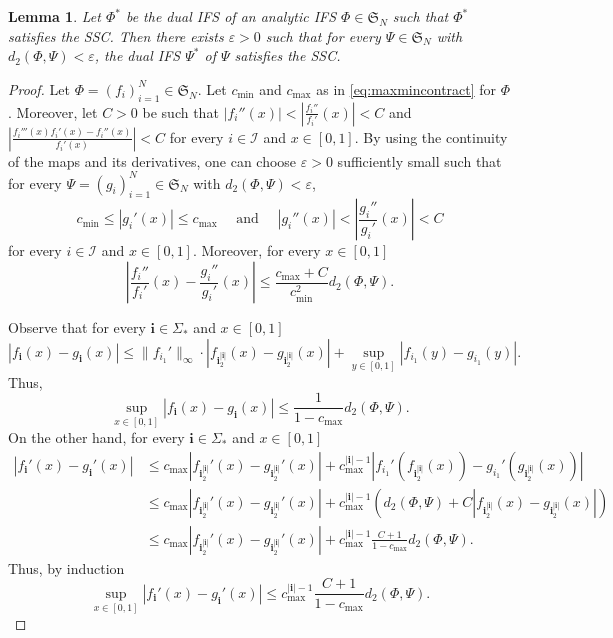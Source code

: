 \documentclass[11pt,]{article}
\def\cref#1{\ref{#1}}%
\newtheorem{lemma}[theorem]{Lemma}
\theoremstyle{definition}
\theoremstyle{remark}
\newcommand{\0}{\mathbf{0}}
\newcommand{\bi}{\mathbf{i}}
\numberwithin{equation}{section}
\begin{document}
\begin{lemma}\label{lem:cont}
  Let $\Phi^*$ be the dual IFS of an analytic IFS $\Phi\in\mathfrak{S}_N$ such that $\Phi^*$
  satisfies the SSC. Then there exists $\varepsilon>0$ such that for every $\Psi\in\mathfrak{S}_N$
  with $d_2(\Phi,\Psi)<\varepsilon$, the dual IFS $\Psi^*$ of $\Psi$ satisfies the SSC.
\end{lemma}

\begin{proof}
  Let $\Phi=(f_i)_{i=1}^N\in\mathfrak{S}_N$. Let $c_{\min}$ and $c_{\max}$ as in
  \cref{eq:maxmincontract} for $\Phi$. Moreover, let $C>0$ be such that
  $|f_i''(x)|<\left|\frac{f_i''}{f_i'}(x)\right|<C$ and
  $\left|\frac{f_i'''(x)f_i'(x)-f_i''(x)}{f_i'(x)}\right|<C$ for every $i\in\mathcal{I}$ and
  $x\in[0,1]$. By using the continuity of the maps and its derivatives, one can choose
  $\varepsilon>0$ sufficiently small such that for every $\Psi=(g_i)_{i=1}^N\in\mathfrak{S}_N$ with
  $d_2(\Phi,\Psi)<\varepsilon$, 
  $$
  c_{\min}\leq|g_i'(x)|\leq c_{\max}\quad\text{ and }\quad |g_i''(x)|<\left|\frac{g_i''}{g_i'}(x)\right|<C
  $$
  for every $i\in\mathcal{I}$ and $x\in[0,1]$. Moreover, for every $x\in[0,1]$
  \begin{equation}\label{eq:tec1}
    \left|\frac{f_i''}{f_i'}(x)-\frac{g_i''}{g_i'}(x)\right|\leq
    \frac{c_{\max}+C}{c_{\min}^{2}}d_2(\Phi,\Psi).
  \end{equation}

  Observe that for every $\bi\in\Sigma_*$ and $x\in[0,1]$
  $$
  |f_{\bi}(x)-g_{\bi}(x)|\leq\|f_{i_1}'\|_{\infty}\cdot
  |f_{\bi_2^{|\bi|}}(x)-g_{\bi_2^{|\bi|}}(x)|+\sup_{y\in[0,1]}|f_{i_1}(y)-g_{i_1}(y)|.
  $$ 
  Thus,
  \begin{equation}\label{eq:tec2}
    \sup_{x\in[0,1]}|f_{\bi}(x)-g_{\bi}(x)|\leq \frac{1}{1-c_{\max}}d_2(\Phi,\Psi).
  \end{equation}
  On the other hand, for every $\bi\in\Sigma_*$ and $x\in[0,1]$
  \begin{align*}
    |f_{\bi}'(x)-g_{\bi}'(x)|
    &\leq
    c_{\max}|f_{\bi_2^{|\bi|}}'(x)-g_{\bi_2^{|\bi|}}'(x)|+
    c_{\max}^{|\bi|-1}|f_{i_1}'(f_{\bi_2^{|\bi|}}(x))-g_{i_1}'(g_{\bi_2^{|\bi|}}(x))|\\
    &\leq c_{\max}|f_{\bi_2^{|\bi|}}'(x)-g_{\bi_2^{|\bi|}}'(x)|+c_{\max}^{|\bi|-1}\left(d_2(\Phi,\Psi)+C|f_{\bi_2^{|\bi|}}(x)-g_{\bi_2^{|\bi|}}(x)|\right)\\
    &\leq c_{\max}|f_{\bi_2^{|\bi|}}'(x)-g_{\bi_2^{|\bi|}}'(x)|+c_{\max}^{|\bi|-1}\frac{C+1}{1-c_{\max}}d_2(\Phi,\Psi).
  \end{align*}
  Thus, by induction
  \begin{equation}\label{eq:tec3}
    \sup_{x\in[0,1]}|f_{\bi}'(x)-g_{\bi}'(x)|\leq c_{\max}^{|\bi|-1}\frac{C+1}{1-c_{\max}}d_2(\Phi,\Psi).
  \end{equation}


\end{proof}
\end{document}
